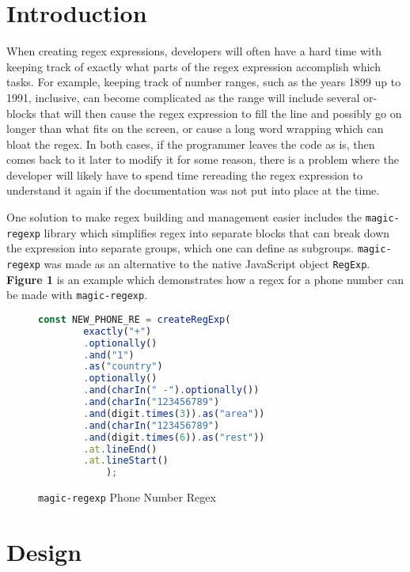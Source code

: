 \documentclass[conference]{IEEEtran}
\begin{document}
\section{Introduction}
When creating regex expressions, developers will often have a hard time with keeping track of exactly
what parts of the regex expression accomplish which tasks. For example, keeping track of number ranges,
such as the years 1899 up to 1991, inclusive, can become complicated as the range will include several or-blocks that
will then cause the regex expression to fill the line and possibly go on longer than what fits on the screen,
or cause a long word wrapping which can bloat the regex.
In both cases, if the programmer leaves the code as is, then comes back to it later to modify it for some reason,
there is a problem where the developer will likely have to spend time rereading the regex expression to understand
it again if the documentation was not put into place at the time.

One solution to make regex building and management easier includes the \texttt{magic-regexp} library
which simplifies regex into separate blocks that can break down the expression into separate
groups, which one can define as subgroups.\cite{magic-regexp}
\texttt{magic-regexp} was made as an alternative to the native JavaScript object \texttt{RegExp}.
\textbf{Figure 1} is an example which demonstrates how a regex for a phone number can be made with
\texttt{magic-regexp}. \cite{omereshone2023}

\vfill\eject

\begin{figure}[htbp]
    \centering
    \label{fig:magic-regexp-phonenum-regex}
    \begin{lstlisting}[language=JavaScript]
    const NEW_PHONE_RE = createRegExp(
        exactly("+")
        .optionally()
        .and("1")
        .as("country")
        .optionally()
        .and(charIn(" -").optionally())
        .and(charIn("123456789")
        .and(digit.times(3)).as("area"))
        .and(charIn("123456789")
        .and(digit.times(6)).as("rest"))
        .at.lineEnd()
        .at.lineStart()
            );
        \end{lstlisting}
    \caption{\texttt{magic-regexp} Phone Number Regex}
\end{figure}

\section{Design}
\end{document}
